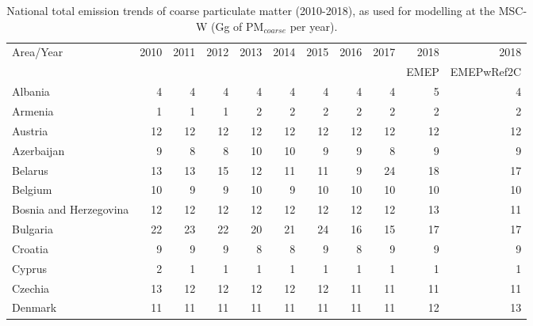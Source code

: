  \begin{table}
 \caption{National total emission trends of coarse particulate matter (2010-2018), as used for modelling at the MSC-W (Gg of PM$_{coarse}$ per year).}
 
 \vspace{15pt}
 
 \scriptsize
 \centering
 \begin{tabular}{|l|r|r|r|r|r|r|r|r|r|r|}
 \hline
                     Area/Year&   2010&   2011&   2012&   2013&   2014&   2015&   2016&   2017&   2018& 2018\\
                &&&&&&&&&EMEP& EMEPwRef2C\\\hline\hline
                       Albania&      4&      4&      4&      4&      4&      4&      4&      4&      5&      4\\\hline
                       Armenia&      1&      1&      1&      2&      2&      2&      2&      2&      2&      2\\\hline
                       Austria&     12&     12&     12&     12&     12&     12&     12&     12&     12&     12\\\hline
                    Azerbaijan&      9&      8&      8&     10&     10&      9&      9&      8&      9&      9\\\hline
                       Belarus&     13&     13&     15&     12&     11&     11&      9&     24&     18&     17\\\hline
                       Belgium&     10&      9&      9&     10&      9&     10&     10&     10&     10&     10\\\hline
        Bosnia and Herzegovina&     12&     12&     12&     12&     12&     12&     12&     12&     13&     11\\\hline
                      Bulgaria&     22&     23&     22&     20&     21&     24&     16&     15&     17&     17\\\hline
                       Croatia&      9&      9&      9&      8&      8&      9&      8&      9&      9&      9\\\hline
                        Cyprus&      2&      1&      1&      1&      1&      1&      1&      1&      1&      1\\\hline
                       Czechia&     13&     12&     12&     12&     12&     12&     11&     11&     11&     11\\\hline
                       Denmark&     11&     11&     11&     11&     11&     11&     11&     11&     12&     13\\\hline

\end{tabular}
\end{table}
